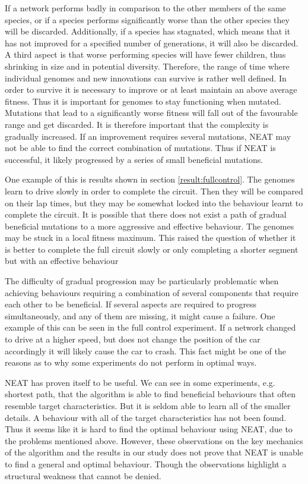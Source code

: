 If a network performs badly in comparison to the other members of the same species, or if a species performs significantly worse than the other species they will be discarded\cite{stanley:neat}. Additionally, if a species has stagnated, which means that it has not improved for a specified number of generations, it will also be discarded. A third aspect is that worse performing species will have fewer children, thus shrinking in size and in potential diversity. Therefore, the range of time where individual genomes and new innovations can survive is rather well defined. In order to survive it is necessary to improve or at least maintain an above average fitness. Thus it is important for genomes to stay functioning when mutated. Mutations that lead to a significantly worse fitness will fall out of the favourable range and get discarded. It is therefore important that the complexity is gradually increased. If an improvement requires several mutations, NEAT may not be able to find the correct combination of mutations. Thus if NEAT is successful, it likely progressed by a series of small beneficial mutations. 

One example of this is results shown in section \ref{result:fullcontrol}. The genomes learn to drive slowly in order to complete the circuit. Then they will be compared on their lap times, but they may be somewhat locked into the behaviour learnt to complete the circuit. It is possible that there does not exist a path of gradual beneficial mutations to a more aggressive and effective behaviour. The genomes may be stuck in a local fitness maximum. This raised the question of whether it is better to complete the full circuit slowly or only completing a shorter segment but with an effective behaviour

The difficulty of gradual progression may be particularly problematic when achieving behaviours requiring a combination of several components that require each other to be beneficial. If several aspects are required to progress simultaneously, and any of them are missing, it might cause a failure. One example of this can be seen in the full control experiment. If a network changed to drive at a higher speed, but does not change the position of the car accordingly it will likely cause the car to crash. This fact might be one of the reasons as to why some experiments do not perform in optimal ways.

NEAT has proven itself to be useful. We can see in some experiments, e.g. shortest path, that the algorithm is able to find beneficial behaviours that often resemble target characteristics. But it is seldom able to learn all of the smaller details. A behaviour with all of the target characteristics has not been found. Thus it seems like it is hard to find the optimal behaviour using NEAT, due to the problems mentioned above. However, these observations on the key mechanics of the algorithm and the results in our study does not prove that NEAT is unable to find a general and optimal behaviour. Though the observations highlight a structural weakness that cannot be denied. 


